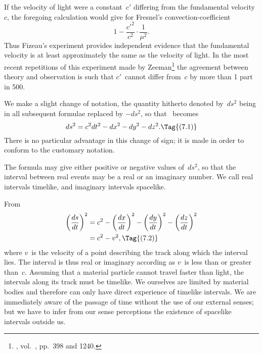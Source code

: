 \documentclass[12pt]{book}
\begin{document}
If the velocity of light  were a constant~$c'$ differing from the
fundamental velocity~$c$, the foregoing calculation would give for Fresnel's
convection\hyp{}coefficient
\[
1 - \frac{c'^{2}}{c^2} \cdot \frac{1}{\mu^2}.
\]
Thus Fizeau's experiment provides independent evidence that the fundamental
%
velocity is at least approximately the same as the velocity of light. In the most
recent repetitions of this experiment made by Zeeman\footnote
  {, vol.~, pp.~398 and 1240.}
the agreement between
theory and observation is such that $c'$~cannot differ from~$c$ by more than 1 part in 500.

%
%

We make a slight change of notation, the quantity hitherto denoted by~$ds^2$
being in all subsequent formulae replaced by $-ds^2$, so that ~becomes
\[
ds^2 = c^2 dt^2 - dx^2 - dy^2 - dz^2.
\Tag{(7.1)}
\]
There is no particular advantage in this change of sign; it is made in order
to conform to the customary notation.

The formula may give either positive or negative values of~$ds^2$, so that the
interval between real events may be a real or an imaginary number. We call
real intervals timelike, and imaginary intervals spacelike.

From 
\begin{align*}
  \left(\frac{ds}{dt}\right)^{2}
  &= c^2 - \left(\frac{dx}{dt}\right)^{2} - \left(\frac{dy}{dt}\right)^{2} - \left(\frac{dz}{dt}\right)^{2} \\
  &= c^2 - v^2,
  \Tag{(7.2)}
\end{align*}
where $v$~is the velocity of a point describing the track along which the interval
lies. The interval is thus real or imaginary according as $v$~is less than or
greater than~$c$. Assuming that a material particle cannot travel faster than
light, the intervals along its track must be timelike. We ourselves are limited
by material bodies and therefore can only have direct experience of timelike
intervals. We are immediately aware of the passage of time without the use
of our external senses; but we have to infer from our sense perceptions the
existence of spacelike intervals outside us.
\end{document}
